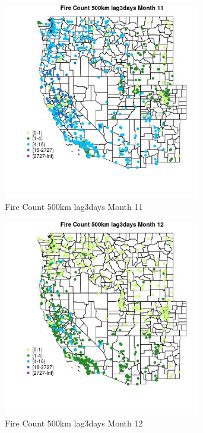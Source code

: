 \begin{figure} 
\centering  
\includegraphics[width=0.77\textwidth]{Code_Outputs/Report_ML_input_PM25_Step4_part_f_de_duplicated_aves_prioritize_24hr_obswNAs_MapObsMo11Fire_Count_500km_lag3days.jpg} 
\caption{\label{fig:Report_ML_input_PM25_Step4_part_f_de_duplicated_aves_prioritize_24hr_obswNAsMapObsMo11Fire_Count_500km_lag3days}Fire Count 500km lag3days Month 11} 
\end{figure} 
 

\begin{figure} 
\centering  
\includegraphics[width=0.77\textwidth]{Code_Outputs/Report_ML_input_PM25_Step4_part_f_de_duplicated_aves_prioritize_24hr_obswNAs_MapObsMo12Fire_Count_500km_lag3days.jpg} 
\caption{\label{fig:Report_ML_input_PM25_Step4_part_f_de_duplicated_aves_prioritize_24hr_obswNAsMapObsMo12Fire_Count_500km_lag3days}Fire Count 500km lag3days Month 12} 
\end{figure} 
 

